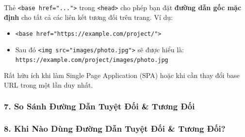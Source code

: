 \documentclass[11pt,oneside]{book}
\newcommand{\thd}[1]{\textcolor{white}{\textbf{\strut #1}}}
\newcommand{\codeinline}[1]{\textcolor{accentOrange}{\texttt{#1}}}
\begin{document}
\begin{noteBox}
Thẻ \codeinline{<base href="...">} trong \codeinline{<head>} cho phép bạn đặt \textbf{đường dẫn gốc mặc định} cho tất cả các liên kết tương đối trên trang. Ví dụ:
\begin{itemize}[leftmargin=1.5em, itemsep=1pt, parsep=0pt]
\sloppy
    \item \codeinline{<base href="https://example.com/project/">}
    \item Sau đó \codeinline{<img src="images/photo.jpg">} sẽ được hiểu là:\\
          \codeinline{https://example.com/project/images/photo.jpg}
\end{itemize}
\fussy
Rất hữu ích khi làm Single Page Application (SPA) hoặc khi cần thay đổi base URL trong một lần duy nhất.
\end{noteBox}

\subsubsection{7. So Sánh Đường Dẫn Tuyệt Đối \& Tương Đối}

\begin{prettyTableBox}
\end{prettyTableBox}

\subsubsection{8. Khi Nào Dùng Đường Dẫn Tuyệt Đối \& Tương Đối?}
\end{document}
